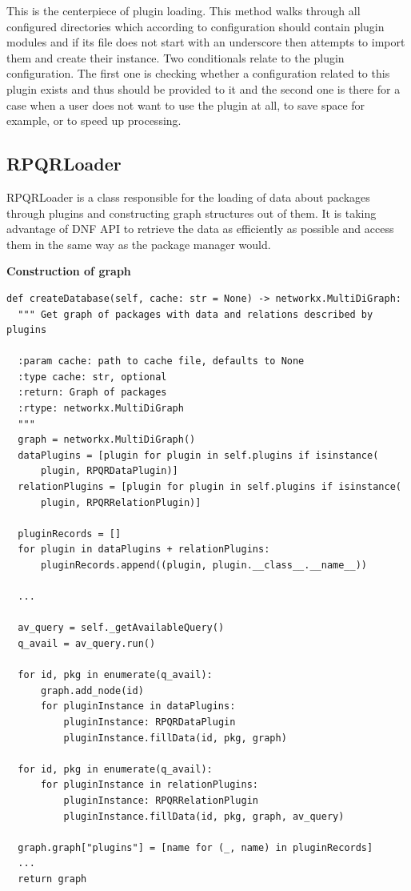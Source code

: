 This is the centerpiece of plugin loading. This method walks through all configured directories
which according to configuration should contain plugin modules and if its file does not start with
an underscore then attempts to import them and create their instance. Two conditionals relate to the plugin configuration. The first one is checking whether a configuration related to
this plugin exists and thus should be provided to it and the second one is there for a case when
a user does not want to use the plugin at all, to save space for example, or to speed up processing.

\subsection*{RPQRLoader}
RPQRLoader is a class responsible for the loading of data about packages through plugins and constructing
graph structures out of them. It is taking advantage of DNF API to retrieve the data as efficiently as
possible and access them in the same way as the package manager would.

\newpage

\textbf{Construction of graph}

\begin{lstlisting}
def createDatabase(self, cache: str = None) -> networkx.MultiDiGraph:
  """ Get graph of packages with data and relations described by plugins

  :param cache: path to cache file, defaults to None
  :type cache: str, optional
  :return: Graph of packages
  :rtype: networkx.MultiDiGraph
  """
  graph = networkx.MultiDiGraph()
  dataPlugins = [plugin for plugin in self.plugins if isinstance(
      plugin, RPQRDataPlugin)]
  relationPlugins = [plugin for plugin in self.plugins if isinstance(
      plugin, RPQRRelationPlugin)]

  pluginRecords = []
  for plugin in dataPlugins + relationPlugins:
      pluginRecords.append((plugin, plugin.__class__.__name__))

  ...

  av_query = self._getAvailableQuery()
  q_avail = av_query.run()

  for id, pkg in enumerate(q_avail):
      graph.add_node(id)
      for pluginInstance in dataPlugins:
          pluginInstance: RPQRDataPlugin
          pluginInstance.fillData(id, pkg, graph)

  for id, pkg in enumerate(q_avail):
      for pluginInstance in relationPlugins:
          pluginInstance: RPQRRelationPlugin
          pluginInstance.fillData(id, pkg, graph, av_query)

  graph.graph["plugins"] = [name for (_, name) in pluginRecords]
  ...
  return graph
\end{lstlisting}

